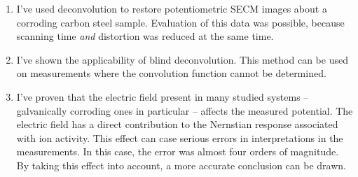 \begin{enumerate}
\item I've used deconvolution to restore potentiometric SECM images about a corroding carbon steel sample.
Evaluation of this data was possible, because scanning time \emph{and} distortion was reduced at the same time.

\item I've shown the applicability of blind deconvolution.
This method can be used on measurements where the convolution function cannot be determined.

\item I've proven that the electric field present in many studied systems -- galvanically corroding ones in particular -- affects the measured potential.
The electric field has a direct contribution to the Nernstian response associated with ion activity.
This effect can case serious errors in interpretations in the measurements.
In this case, the error was almost four orders of magnitude. 
By taking this effect into account, a more accurate conclusion can be drawn.

\end{enumerate}
